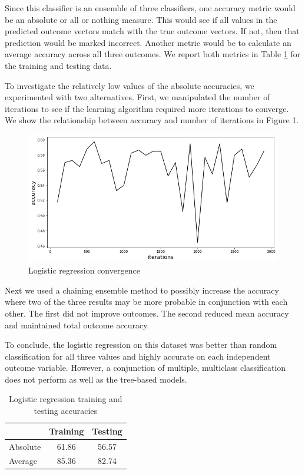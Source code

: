 \documentclass{article}
\begin{document}
Since this classifier is an ensemble of three classifiers, one accuracy metric would be an absolute or all or nothing measure. This would see if all values in the predicted outcome vectors match with the true outcome vectors. If not, then that prediction would be marked incorrect. Another metric would be to calculate an average accuracy across all three outcomes. We report both metrics in Table \ref{logregtbl} for the training and testing data.

To investigate the relatively low values of the absolute accuracies,  we experimented with two alternatives. First, we manipulated the number of iterations to see if the learning algorithm required more iterations to converge. We show the  relationship between accuracy and number of iterations in Figure 1.

\begin{figure}
  \centering
  \includegraphics[width=\textwidth]{lgreg_acc.png}
  \caption{Logistic regression convergence}
\end{figure}

Next we used a chaining ensemble method to possibly increase the accuracy where two of the three results may be more probable in conjunction with each other. The first did not improve outcomes. The second reduced mean accuracy and maintained total outcome accuracy.

To conclude, the logistic regression on this dataset was better than random classification for all three values and highly accurate on each independent outcome variable. However, a conjunction of multiple, multiclass classification does not perform as well as the tree-based models.

\begin{table}
  \caption{Logistic regression training and testing accuracies}
  \label{logregtbl}
  \centering
\begin{tabular}{l|cc}
\hline 
        & Training & Testing \\
\hline
Absolute & 61.86    & 56.57   \\
Average  & 85.36    & 82.74  \\
\hline
\end{tabular}
\end{table}
\end{document}
